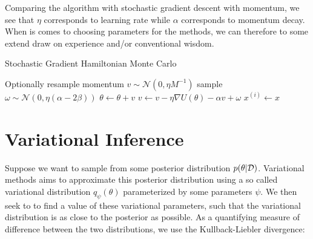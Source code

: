 Comparing the algorithm with stochastic gradient descent with momentum, we see that  $\eta$ corresponds to learning rate while $\alpha$ corresponds to momentum decay. 
When is comes to choosing parameters for the methods, we can therefore to some extend draw on experience and/or conventional wisdom.

\begin{algorithm}[htpb]
    \caption{Stochastic Gradient Hamiltonian Monte Carlo} \label{alg:sghmc}
    \begin{algorithmic}
        \State Optionally resample momentum $v \sim \mathcal{N}(0, \eta M^{-1})$
        \State sample $\omega \sim \mathcal{N}(0, \eta (\alpha - 2\beta))$
        \State $\theta \gets \theta + v $ 
        \State $v\gets v - \eta \nabla U(\theta) - \alpha v + \omega$
        \EndFor
        \State $x^{(i)} \gets x$
        \EndFor
    \end{algorithmic}
\end{algorithm}

\section{Variational Inference}

Suppose we want to sample from some posterior distribution $p(\theta | \mathcal{D})$. 
Variational methods aims to approximate this posterior distribution using a so called variational distribution $q_\psi (\theta)$ parameterized by some parameters $\psi$.  
We then seek to to find a value of these variational parameters, such that the variational distribution is as close to the posterior as possible. 
As a quantifying measure of difference between the two distributions, we use the Kullback-Liebler divergence:


